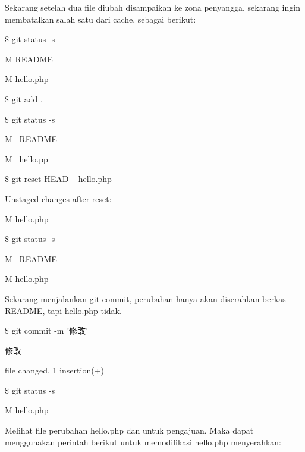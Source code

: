 Sekarang setelah dua file diubah disampaikan ke zona penyangga, sekarang ingin membatalkan salah satu dari cache, sebagai berikut: \par
\noindent 
{\fontsize{10pt}{10pt}\selectfont  $  \$  $ git status -s} \par
\noindent 
{\fontsize{10pt}{10pt}\selectfont  M README} \par
\noindent 
{\fontsize{10pt}{10pt}\selectfont  M hello.php} \par
\noindent 
{\fontsize{10pt}{10pt}\selectfont  $  \$  $ git add .} \par
\noindent 
{\fontsize{10pt}{10pt}\selectfont  $  \$  $ git status -s} \par
\noindent 
{\fontsize{10pt}{10pt}\selectfont M~ README} \par
\noindent 
{\fontsize{10pt}{10pt}\selectfont M~ hello.pp} \par
\noindent 
{\fontsize{10pt}{10pt}\selectfont  $  \$  $ git reset HEAD -- hello.php } \par
\noindent 
{\fontsize{10pt}{10pt}\selectfont Unstaged changes after reset:} \par
\noindent 
{\fontsize{10pt}{10pt}\selectfont M \hspace*{0.64in} hello.php} \par
\noindent 
{\fontsize{10pt}{10pt}\selectfont  $  \$  $ git status -s} \par
\noindent 
{\fontsize{10pt}{10pt}\selectfont M~ README} \par
\noindent 
{\fontsize{10pt}{10pt}\selectfont  M hello.php} \par
\vspace{12pt}
Sekarang menjalankan git commit, perubahan hanya akan diserahkan berkas README, tapi hello.php tidak.  \par
\noindent 
{\fontsize{10pt}{10pt}\selectfont  $  \$  $ git commit -m '修改'} \par
\noindent 
{\fontsize{10pt}{10pt} 修改} \par
\noindent 
{\fontsize{10pt}{10pt} file changed, 1 insertion(+)} \par
\noindent 
{\fontsize{10pt}{10pt}\selectfont  $  \$  $ git status -s} \par
\noindent 
{\fontsize{10pt}{10pt}\selectfont  M hello.php} \par
\vspace{12pt}
Melihat file perubahan hello.php dan untuk pengajuan. Maka dapat menggunakan perintah berikut untuk memodifikasi hello.php menyerahkan:  \par
